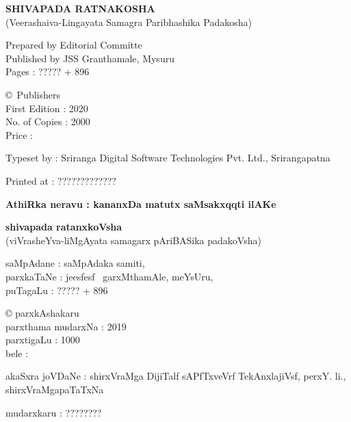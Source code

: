 \thispagestyle{empty}
\noindent
{\rm\sf\bfseries SHIVAPADA RATNAKOSHA}\\[5pt]
{\rm (Veerashaiva-Lingayata Samagra Paribhashika Padakosha)} 

\noindent
{\rm Prepared by Editorial Committe}\\
{\rm Published by JSS Granthamale, Mysuru}\\[8pt]
{\rm Pages : ????? + 896}

\vspace{1cm}

\noindent
{\rm \copyright \ Publishers}\\[7pt]
{\rm First Edition : 2020}\\[7pt]
{\rm No. of Copies : 2000}\\[7pt]
{\rm Price :} \rupee

\bigskip

\noindent
{\rm Typeset by : Sriranga Digital Software Technologies Pvt. Ltd., Srirangapatna}

\medskip

\noindent
{\rm Printed at : ?????????????}

\vfill

\noindent
{\bf AthiRka neravu : kananxDa matutx saMsakxqqti ilAKe}

\bigskip

\noindent
{\bf\large shivapada ratanxkoVsha}\\[5pt]
(viVrasheYva-liMgAyata samagarx pAriBASika padakoVsha) 

\noindent
saMpAdane : saMpAdaka samiti,\\
parxkaTaNe : je{esf}{esf} \ garxMthamAle, meYsUru,\\[8pt]
puTagaLu : {\rm ????? +} 896

\vspace{1cm}

\noindent
{\rm \copyright} parxkAshakaru\\[7pt]
parxthama mudarxNa : 2019\\[7pt]
parxtigaLu : 1000\\[10pt]
bele : \rupee

\bigskip

\noindent
akaSxra joVDaNe : shirxVraMga DijiTalf sAPfTxveVrf TekAnxlajiVsf, perxY. li., shirxVraMgapaTaTxNa

\medskip

\noindent
mudarxkaru : ????????

\newpage

\thispagestyle{empty}

